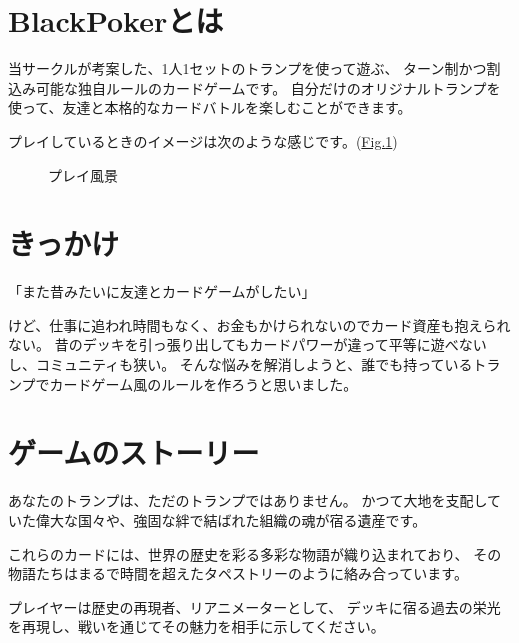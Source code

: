 \documentclass[a5paper,8pt,dvipdfmx]{sphinxmanual}
\begin{document}
\section{BlackPokerとは}
\label{\detokenize{init/init:blackpoker}}
\sphinxAtStartPar
当サークルが考案した、1人1セットのトランプを使って遊ぶ、
ターン制かつ割込み可能な独自ルールのカードゲームです。
自分だけのオリジナルトランプを使って、友達と本格的なカードバトルを楽しむことができます。

\sphinxAtStartPar
プレイしているときのイメージは次のような感じです。(\hyperref[\detokenize{init/init:play-image}]{Fig.\@ \ref{\detokenize{init/init:play-image}}})

\begin{figure}[htbp]
\centering
\capstart

\noindent{}
\caption{プレイ風景}\label{\detokenize{init/init:id7}}\label{\detokenize{init/init:play-image}}\end{figure}


\section{きっかけ}
\label{\detokenize{init/init:id2}}
\begin{sphinxVerbatim}[commandchars=\\\{\}]
「また昔みたいに友達とカードゲームがしたい」
\end{sphinxVerbatim}

\sphinxAtStartPar
けど、仕事に追われ時間もなく、お金もかけられないのでカード資産も抱えられない。
昔のデッキを引っ張り出してもカードパワーが違って平等に遊べないし、コミュニティも狭い。
そんな悩みを解消しようと、誰でも持っているトランプでカードゲーム風のルールを作ろうと思いました。


\section{ゲームのストーリー}
\label{\detokenize{init/init:id3}}
\sphinxAtStartPar
あなたのトランプは、ただのトランプではありません。
かつて大地を支配していた偉大な国々や、強固な絆で結ばれた組織の魂が宿る遺産です。

\sphinxAtStartPar
これらのカードには、世界の歴史を彩る多彩な物語が織り込まれており、
その物語たちはまるで時間を超えたタペストリーのように絡み合っています。

\sphinxAtStartPar
プレイヤーは歴史の再現者、リアニメーターとして、
デッキに宿る過去の栄光を再現し、戦いを通じてその魅力を相手に示してください。
\end{document}
